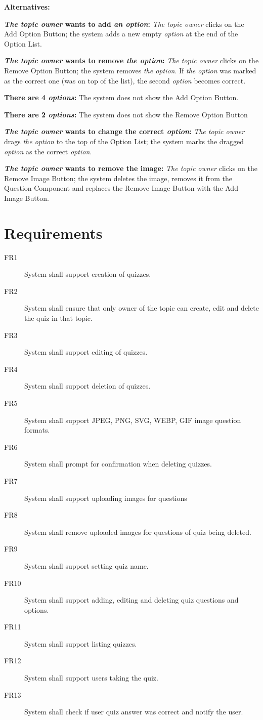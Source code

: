\documentclass[
    english, %
]{VUMIFPSkursinis}
\begin{document}
\noindent\textbf{\fontsize{13}{15}\selectfont Alternatives:}

\textbf{\textit{The topic owner} wants to add \textit{an option}:} \textit{The topic owner} clicks on the Add Option Button; the system adds a new empty \textit{option} at the end of the Option List.

\textbf{\textit{The topic owner} wants to remove \textit{the option}:} \textit{The topic owner} clicks on the Remove Option Button; the system removes \textit{the option}. If \textit{the option} was marked as the correct one (was on top of the list), the second \textit{option} becomes correct.

\textbf{There are 4 \textit{options}:} The system does not show the Add Option Button.

\textbf{There are 2 \textit{options}:} The system does not show the Remove Option Button

\textbf{\textit{The topic owner} wants to change the correct \textit{option}:} \textit{The topic owner} drags \textit{the option} to the top of the Option List; the system marks the dragged \textit{option} as the correct \textit{option}.

\textbf{\textit{The topic owner} wants to remove the image:} \textit{The topic owner} clicks on the Remove Image Button; the system deletes the image, removes it from the Question Component and replaces the Remove Image Button with the Add Image Button.

\section{Requirements}

\begin{description}
    \item[FR1] System shall support creation of quizzes.
    \item[FR2] System shall ensure that only owner of the topic can create, edit and delete the quiz in that topic.
    \item[FR3] System shall support editing of quizzes.
    \item[FR4] System shall support deletion of quizzes.
    \item[FR5] System shall support JPEG, PNG, SVG, WEBP, GIF image question formats.
    \item[FR6] System shall prompt for confirmation when deleting quizzes.
    \item[FR7] System shall support uploading images for questions
    \item[FR8] System shall remove uploaded images for questions of quiz being deleted.
    \item[FR9] System shall support setting quiz name.
    \item[FR10] System shall support adding, editing and deleting quiz questions and options.
    \item[FR11] System shall support listing quizzes.
    \item[FR12] System shall support users taking the quiz.
    \item[FR13] System shall check if user quiz answer was correct and notify the user.
\end{description}

\listoffigures
\printbibliography[heading=bibintoc]
\end{document}
